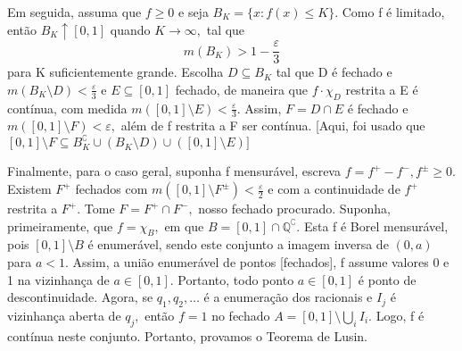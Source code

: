 \documentclass[MeasureTheory/measure_theory.tex]{subfiles}
\begin{document}
\begin{proof*}
	Em seguida, assuma que \(f\geq 0\) e seja \(B_{K} = \{x: f(x) \leq K\}.\) Como f é limitado, então \(B_{K}\uparrow [0, 1]\) quando \(K\to \infty,\) tal que
	\[
		m(B_{K}) > 1 - \frac{\varepsilon }{3}
	\]
	para K suficientemente grande. Escolha \(D\subseteq B_{K}\) tal que D é fechado e \(m(B_{K}\setminus{D}) < \frac{\varepsilon }{3}\) e \(E\subseteq [0, 1]\) fechado, de maneira que
	\(f \cdot \chi_{D}\) restrita a E é contínua, com medida \(m([0, 1]\setminus{E}) < \frac{\varepsilon }{3}.\) Assim, \(F = D\cap E\) é fechado e \(m([0, 1]\setminus{F}) < \varepsilon ,\)
	além de f restrita a F ser contínua. [Aqui, foi usado que \([0,1]\setminus{F}\subseteq B_{K}^{\complement}\cup (B_{K}\setminus{D})\cup ([0, 1]\setminus{E})]\)

	Finalmente, para o caso geral, suponha f mensurável, escreva \(f = f^{+} - f^{-}, f^{\pm} \geq 0.\) Existem \(F^{+}\) fechados com \(m([0, 1]\setminus{F^{\pm}}) < \frac{\varepsilon }{2}\) e com a continuidade
	de \(f^{+}\) restrita a \(F^{+}.\) Tome \(F = F^{+}\cap F^{-},\) nosso fechado procurado. Suponha, primeiramente, que \(f=\chi_{B},\) em que \(B = [0, 1]\cap \mathbb{Q}^{\complement}.\) Esta f é Borel mensurável, pois
	\([0, 1]\setminus{B}\) é enumerável, sendo este conjunto a imagem inversa de \((0, a)\) para \(a < 1\). Assim, a união enumerável de pontos [fechados], f assume valores 0 e 1 na vizinhança de \(a\in [0, 1].\) Portanto,
	todo ponto \(a\in [0, 1]\) é ponto de descontinuidade. Agora, se \(q_1, q_2, \dotsc \) é a enumeração dos racionais e \(I_{j}\) é vizinhança aberta de \(q_{j},\) então \(f=1\) no fechado \(A = [0, 1]\setminus{\bigcup_{i}^{}I_{i}.}\)
	Logo, f é contínua neste conjunto. Portanto, provamos o Teorema de Lusin.
\end{proof*}
\end{document}
